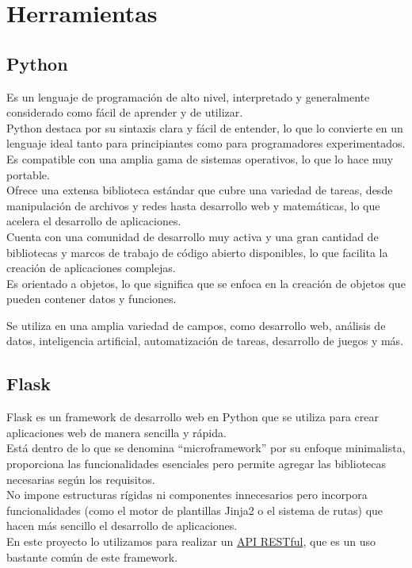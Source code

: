 \section{Herramientas}

\subsection{Python~\cite{lutz2001programming}}
Es un lenguaje de programación de alto nivel, interpretado y generalmente 
considerado como fácil de aprender y de utilizar. \\
Python destaca por su sintaxis clara y fácil de entender, 
lo que lo convierte en un lenguaje ideal tanto para principiantes 
como para programadores experimentados.\\
Es compatible con una amplia gama de sistemas operativos, 
lo que lo hace muy portable.\\

Ofrece una extensa biblioteca estándar que cubre una variedad de tareas, 
desde manipulación de archivos y redes hasta desarrollo web y 
matemáticas, lo que acelera el desarrollo de aplicaciones.\\
Cuenta con una comunidad de desarrollo muy activa y 
una gran cantidad de bibliotecas y marcos de trabajo de código abierto disponibles, 
lo que facilita la creación de aplicaciones complejas.\\
Es orientado a objetos, lo que significa que se enfoca en la creación de objetos 
que pueden contener datos y funciones.

Se utiliza en una amplia variedad de campos, como desarrollo web, 
análisis de datos, inteligencia artificial, automatización de tareas, desarrollo de juegos y más.

\subsection{Flask~\cite{dwyer2017flask}}
Flask es un framework de desarrollo web en Python que se utiliza 
para crear aplicaciones web de manera sencilla y rápida. \\
Está dentro de lo que se denomina ``microframework'' por su enfoque minimalista, proporciona 
las funcionalidades esenciales pero permite agregar las bibliotecas necesarias según los requisitos.\\
No impone estructuras rígidas ni componentes innecesarios pero incorpora funcionalidades 
(como el motor de plantillas Jinja2 o el sistema de rutas) que hacen 
más sencillo el desarrollo de aplicaciones. \\
En este proyecto lo utilizamos para realizar un \href{https://aws.amazon.com/es/what-is/restful-api}{API RESTful}, que es un uso bastante común de este framework.


